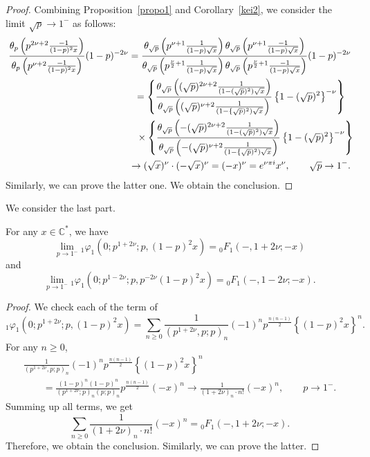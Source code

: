 \documentclass[pdftex]{sigma}
\begin{document}
\begin{proof}
Combining Proposition~\ref{propo1} and Corollary~\ref{kei2}, we consider the limit $\sqrt{p}\to 1^-$ as follows:
\begin{gather*}
 \frac{\theta_p\left(p^{2\nu +2}\frac{-1}{(1-p)^2x}\right)}{\theta_p\left(p^{\nu +2}\frac{-1}{(1-p)^2x}\right)}(1-p)^{-2\nu}
=\frac{\theta_{\sqrt{p}}\left(p^{\nu +1}\frac{1}{(1-p)\sqrt{x}}\right) \theta_{\sqrt{p}}\left(p^{\nu +1}\frac{-1}{(1-p)\sqrt{x}}\right)}
{\theta_{\sqrt{p}}\left(p^{\frac{\nu}{2}+1}\frac{1}{(1-p)\sqrt{x}}\right)\theta_{\sqrt{p}}\left(p^{\frac{\nu}{2}+1}\frac{-1}{(1-p)\sqrt{x}}\right)}
(1-p)^{-2\nu}\\
 \hphantom{\frac{\theta_p\left(p^{2\nu +2}\frac{-1}{(1-p)^2x}\right)}{\theta_p\left(p^{\nu +2}\frac{-1}{(1-p)^2x}\right)}(1-p)^{-2\nu}}{}
 =\left\{\frac{\theta_{\sqrt{p}}\left((\sqrt{p})^{2\nu +2}\frac{1}{(1-(\sqrt{p})^2)\sqrt{x}}\right) }{\theta_{\sqrt{p}}\left((\sqrt{p})^{\nu +2}\frac{1}{(1-\{\sqrt{p})^2)\sqrt{x}}\right)}\left\{1-(\sqrt{p})^2\right\}^{-\nu}\right\}\\
\hphantom{\frac{\theta_p\left(p^{2\nu +2}\frac{-1}{(1-p)^2x}\right)}{\theta_p\left(p^{\nu +2}\frac{-1}{(1-p)^2x}\right)}(1-p)^{-2\nu}=}{}
\times
\left\{\frac{\theta_{\sqrt{p}}\left(-(\sqrt{p})^{2\nu +2}\frac{1}{(1-(\sqrt{p})^2)\sqrt{x}}\right) }{\theta_{\sqrt{p}}\left(-(\sqrt{p})^{\nu +2}\frac{1}{(1-\{\sqrt{p})^2)\sqrt{x}}\right)}\left\{1-(\sqrt{p})^2\right\}^{-\nu}\right\}\\
\hphantom{\frac{\theta_p\left(p^{2\nu +2}\frac{-1}{(1-p)^2x}\right)}{\theta_p\left(p^{\nu +2}\frac{-1}{(1-p)^2x}\right)}(1-p)^{-2\nu}}{}
 \to (\sqrt{x})^\nu\cdot (-\sqrt{x})^\nu=(-x)^\nu
=e^{\nu\pi i}x^\nu , \qquad \sqrt{p}\to 1^-.
\end{gather*}
Similarly, we can prove the latter one. We obtain the conclusion.
\end{proof}


We consider the last part.
\begin{lemma}\label{limbas}For any $x\in\mathbb{C}^*$, we have
\[
\lim_{p\to 1^-}{}_1\varphi_1\left(0;p^{1+2\nu};p,(1-p)^2x\right)={}_0F_1\left(-,1+2\nu ;-x\right)\]
and
\[
\lim_{p\to 1^-}{}_1\varphi_1\left(0;p^{1-2\nu};p,p^{-2\nu }(1-p)^2x\right)={}_0F_1\left(-,1-2\nu ;-x\right).
\]
\end{lemma}
\begin{proof}
We check each of the term of
\[{}_1\varphi_1\left(0;p^{1+2\nu};p,(1-p)^2x\right)
=\sum_{n\ge 0}\frac{1}{(p^{1+2\nu},p;p)_n}(-1)^np^{\frac{n(n-1)}{2}}\left\{(1-p)^2x\right\}^n.\]
For any $n\ge 0$,
\begin{gather*}
\frac{1}{(p^{1+2\nu},p;p)_n}(-1)^np^{\frac{n(n-1)}{2}}
\left\{(1-p)^2x\right\}^n \\
\qquad {}=\frac{(1-p)^n(1-p)^n}{(p^{1+2\nu};p)_n(p;p)_n}p^{\frac{n(n-1)}{2}}\left(-x\right)^n
 \to \frac{1}{(1+2\nu )_n\cdot n!}\left(-x\right)^n, \qquad p\to 1^-.
\end{gather*}
Summing up all terms, we get
\[\sum_{n\ge 0}\frac{1}{(1+2\nu )_n\cdot n!}\left(-x\right)^n
={}_0F_1\left(-,1+2\nu ;-x\right).\]
Therefore, we obtain the conclusion. Similarly, we can prove the latter.
\end{proof}
\end{document}
